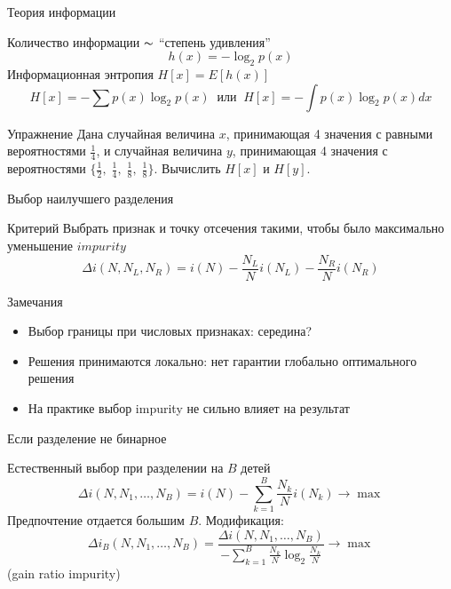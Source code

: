 \documentclass[10pt]{beamer}
\begin{document}
\begin{frame}{Теория информации}

Количество информации $\thicksim$ ``степень удивления''
\[
h(x) = -\log_2 p(x)
\]
Информационная энтропия $H[x] = E[h(x)]$
\[
H[x] = -\sum p(x) \log_2 p(x) \;\;\text{или}\;\; H[x] = - \int p(x) \log_2 p(x) dx
\]
\begin{exampleblock}{Упражнение}
Дана случайная величина $x$, принимающая 4 значения с равными вероятностями $\frac 1 4$, и случайная величина $y$, принимающая 4 значения с вероятностями $\{\frac 1 2, \; \frac 1 4, \; \frac 1 8, \; \frac 1 8\}$. Вычислить $H[x]$ и $H[y]$.
\end{exampleblock}

\end{frame}

\begin{frame}{Выбор наилучшего разделения}

\begin{block}{Критерий}
Выбрать признак и точку отсечения такими, чтобы было максимально уменьшение $impurity$
\[
\Delta i(N, N_L, N_R) = i(N) - \frac {N_L}{N} i(N_L) - \frac {N_R}{N} i(N_R)
\]
\end{block}

\vspace{1em}
Замечания
\begin{itemize}
\item Выбор границы при числовых признаках: середина?
\item Решения принимаются локально: нет гарантии глобально оптимального решения
\item На практике выбор impurity не сильно влияет на результат
\end{itemize}

\end{frame}

\begin{frame}{Если разделение не бинарное}

Естественный выбор при разделении на $B$ детей
\[
\Delta i(N, N_1, \ldots, N_B) = i(N) - \sum_{k=1}^B \frac{N_k}{N} i(N_k) \rightarrow \max
\]
Предпочтение отдается большим $B$. Модификация:
\[
\Delta i_B(N, N_1, \ldots, N_B) = \frac{\Delta i(N, N_1, \ldots, N_B)}{-\sum_{k=1}^B \frac{N_k}{N} \log_2 \frac{N_k}{N}} \rightarrow \max
\]
(gain ratio impurity)

\end{frame}
\end{document}
